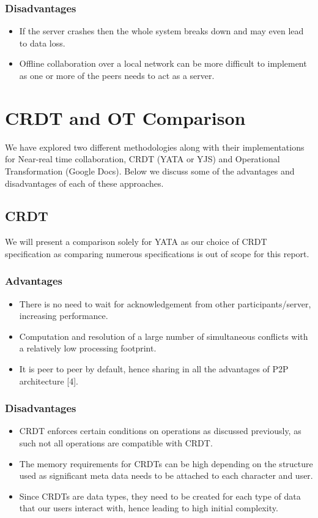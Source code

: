 \documentclass[9pt, titlepage]{article}
\begin{document}
  \subsubsection*{Disadvantages}
  \begin{itemize}
    \item If the server crashes then the whole system breaks down and may even lead to data loss.
    \item Offline collaboration over a local network can be more difficult to implement as one or more of the peers needs to act as a server.
  \end{itemize}

  \section{CRDT and OT Comparison}
  We have explored two different methodologies along with their implementations for Near-real time collaboration, CRDT (YATA or YJS) and
  Operational Transformation (Google Docs). Below we discuss some of the advantages and disadvantages of each of these approaches.

  \subsection{CRDT}
  We will present a comparison solely for YATA as our choice of CRDT specification as comparing numerous specifications is out of scope for this report.
  
  \subsubsection{Advantages}
  \begin{itemize}
    \item There is no need to wait for acknowledgement from other participants/server, increasing performance.
    \item Computation and resolution of a large number of simultaneous conflicts with a relatively low processing footprint.
    \item It is peer to peer by default, hence sharing in all the advantages of P2P architecture [4].
  \end{itemize}

  \subsubsection{Disadvantages}
  \begin{itemize}
    \item CRDT enforces certain conditions on operations as discussed previously, as such not all operations are compatible with CRDT.
    \item The memory requirements for CRDTs can be high depending on the structure used as significant meta data needs to be attached to each character and user.
    \item Since CRDTs are data types, they need to be created for each type of data that our users interact with, hence leading to high initial complexity.
  \end{itemize}
\end{document}
